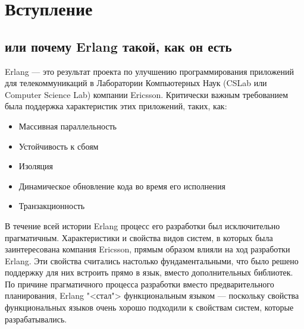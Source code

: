 \chapter[Вступление, или почему Erlang такой, как он есть]{Вступление}
\section*{или почему Erlang такой, как он есть}
\label{background}

Erlang --- это результат проекта по улучшению программирования приложений для 
телекоммуникаций в Лаборатории Компьютерных Наук (CSLab или Computer Science Lab)
компании Ericsson. Критически важным требованием была поддержка характеристик 
этих приложений, таких, как: 

\begin{itemize}
	\item Массивная параллельность
	\item Устойчивость к сбоям
	\item Изоляция
	\item Динамическое обновление кода во время его исполнения
	\item Транзакционность
\end{itemize}

В течение всей истории Erlang процесс его разработки был исключительно 
прагматичным. Характеристики и свойства видов систем, в которых была заинтересована
компания Ericsson, прямым образом влияли на ход разработки Erlang. Эти свойства
считались настолько фундаментальными, что было решено поддержку для них встроить
прямо в язык, вместо дополнительных библиотек. По причине прагматичного процесса
разработки вместо предварительного планирования, Erlang "<стал"> функциональным
языком --- поскольку свойства функциональных языков очень хорошо подходили к
свойствам систем, которые разрабатывались.

